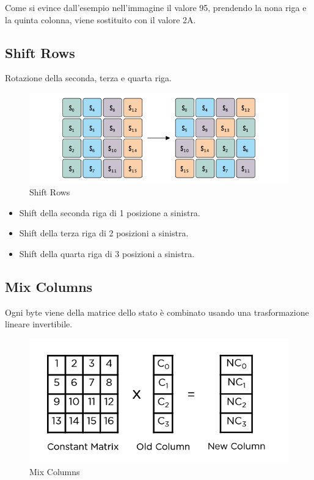 \textsf{\small Come si evince dall'esempio nell'immagine il valore 95, prendendo la nona riga e la quinta colonna, viene sostituito con il valore 2A.}

\subsection{Shift Rows}


\textsf{\small Rotazione della seconda, terza e quarta riga.}

\begin{figure}[H]
	\centering
	\includegraphics[width=.9\textwidth, height=.9\textheight, keepaspectratio]{./images/aes/aes-shift-rows.png}
	\caption{Shift Rows}
	\label{fig:shift_rows2}
\end{figure}

\begin{itemize}
	\item \textsf{\small Shift della seconda riga di 1 posizione a sinistra.}
	\item \textsf{\small Shift della terza riga di 2 posizioni a sinistra.}
	\item \textsf{\small Shift della quarta riga di 3 posizioni a sinistra.}
\end{itemize}

\subsection{Mix Columns}

 

\textsf{\small Ogni byte viene della matrice dello stato è combinato usando una trasformazione lineare invertibile.}

\begin{figure}[H]
	\centering
	\includegraphics[width=.9\textwidth, height=.9\textheight, keepaspectratio]{./images/aes/mixcolumns.png}
	\caption{Mix Columns}
	\label{fig:mix_columns2}
\end{figure}

